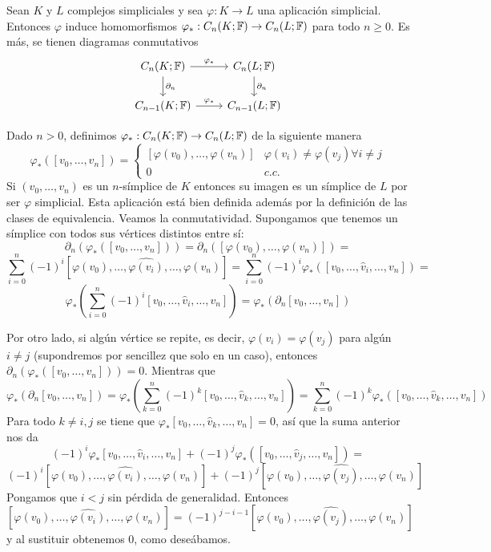 \documentclass[HS.tex]{subfiles}
\begin{document}
\begin{prop}
Sean $K$ y $L$ complejos simpliciales y sea $\varphi:K\to L$ una aplicación simplicial. Entonces $\varphi$ induce homomorfismos $\varphi_*:C_n(K;\mathbb{F})\to C_n(L;\mathbb{F})$ para todo $n\geq 0$. Es más, se tienen diagramas conmutativos
\[
\begin{tikzcd}
C_n(K;\F)\arrow[r, "\varphi_*"]\arrow[d, "\partial_n"] & C_n(L;\F)\arrow[d, "\partial_n"]\\
C_{n-1}(K;\F)\arrow[r, "\varphi_*"] & C_{n-1}(L;\F)
\end{tikzcd}
\]
\end{prop}
\begin{dem}
Dado $n>0$, definimos $\varphi_*:C_n(K;\mathbb{F})\to C_n(L;\mathbb{F})$ de la siguiente manera
\[
\varphi_*([v_0,\dots, v_n])=\begin{cases}
[\varphi(v_0), \dots, \varphi(v_n)] & \varphi(v_i)\neq\varphi(v_j)\forall i\neq j\\
0& c.c.
\end{cases}
\]
Si $(v_0,\dots, v_n)$ es un $n$-símplice de $K$ entonces su imagen es un símplice de $L$ por ser $\varphi$ simplicial. Esta aplicación está bien definida además por la definición de las clases de equivalencia. Veamos la conmutatividad. Supongamos que tenemos un símplice con todos sus vértices distintos entre sí:
\[
\partial_n(\varphi_*([v_0,\dots, v_n]))=\partial_n([\varphi(v_0), \dots, \varphi(v_n)])=
\]
\[
\sum_{i=0}^n(-1)^i[\varphi(v_0), \dots,\widehat{\varphi(v_i)},\dots,  \varphi(v_n)]=\sum_{i=0}^n(-1)^i\varphi_*([v_0,\dots, \hat{v}_i,\dots, v_n])=
\]
\[
\varphi_*\left(\sum_{i=0}^n(-1)^i[v_0,\dots, \hat{v}_i,\dots, v_n]\right)=\varphi_*(\partial_n[v_0,\dots, v_n])
\]

Por otro lado, si algún vértice se repite, es decir, $\varphi(v_i)=\varphi(v_j)$ para algún $i\neq j$ (supondremos por sencillez que solo en un caso), entonces $\partial_n(\varphi_*([v_0,\dots, v_n]))=0$. Mientras que
\[
\varphi_*(\partial_n[v_0,\dots, v_n])=\varphi_*\left(\sum_{k=0}^n(-1)^k[v_0, \dots, \hat{v}_k,\dots, v_n]\right)=\sum_{k=0}^n(-1)^k\varphi_*([v_0,\dots, \hat{v}_k,\dots, v_n])
\]
Para todo $k\neq i,j$ se tiene que $\varphi_*[v_0,\dots, \hat{v}_k,\dots, v_n]=0$, así que la suma anterior nos da
\[
(-1)^i\varphi_*[v_0,\dots, \hat{v}_i,\dots, v_n]+(-1)^j\varphi_*([v_0,\dots, \hat{v}_j,\dots, v_n])=
\]
\[
(-1)^i[\varphi(v_0),\dots, \widehat{\varphi(v_i)},\dots, \varphi(v_n)]+(-1)^j[\varphi(v_0),\dots, \widehat{\varphi(v_j)},\dots, \varphi(v_n)]
\]
Pongamos que $i<j$ sin pérdida de generalidad. Entonces
\[
[\varphi(v_0),\dots, \widehat{\varphi(v_i)},\dots, \varphi(v_n)]=(-1)^{j-i-1}[\varphi(v_0),\dots, \widehat{\varphi(v_j)},\dots, \varphi(v_n)]
\]
y al sustituir obtenemos 0, como deseábamos.
\QED
\end{dem}
\end{document}
